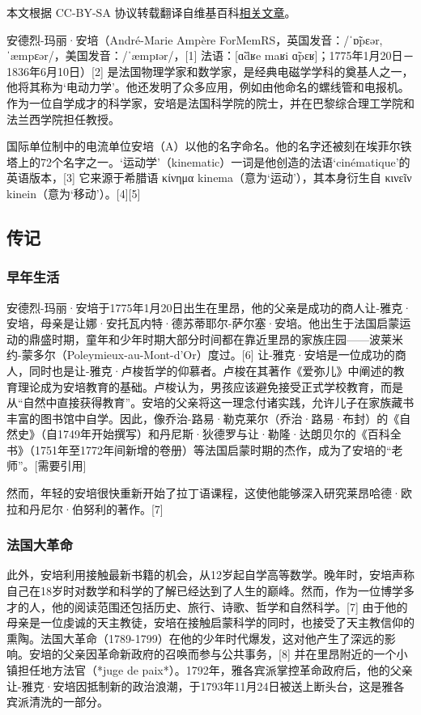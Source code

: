 
本文根据 CC-BY-SA 协议转载翻译自维基百科\href{https://en.wikipedia.org/wiki/Andr\%C3\%A9-Marie_Amp\%C3\%A8re}{相关文章}。

安德烈-玛丽·安培（André-Marie Ampère ForMemRS，英国发音：/ˈɒ̃pɛər, ˈæmpɛər/，美国发音：/ˈæmpɪər/，[1] 法语：[ɑ̃dʁe maʁi ɑ̃pɛʁ]；1775年1月20日－1836年6月10日）[2] 是法国物理学家和数学家，是经典电磁学学科的奠基人之一，他将其称为‘电动力学’。他还发明了众多应用，例如由他命名的螺线管和电报机。作为一位自学成才的科学家，安培是法国科学院的院士，并在巴黎综合理工学院和法兰西学院担任教授。

国际单位制中的电流单位安培（A）以他的名字命名。他的名字还被刻在埃菲尔铁塔上的72个名字之一。‘运动学’（kinematic）一词是他创造的法语‘cinématique’的英语版本，[3] 它来源于希腊语 κίνημα kinema（意为‘运动’），其本身衍生自 κινεῖν kinein（意为‘移动’）。[4][5]
\subsection{传记}
\subsubsection{早年生活} 
安德烈-玛丽·安培于1775年1月20日出生在里昂，他的父亲是成功的商人让-雅克·安培，母亲是让娜·安托瓦内特·德苏蒂耶尔-萨尔塞·安培。他出生于法国启蒙运动的鼎盛时期，童年和少年时期大部分时间都在靠近里昂的家族庄园——波莱米约-蒙多尔（Poleymieux-au-Mont-d'Or）度过。[6] 让-雅克·安培是一位成功的商人，同时也是让-雅克·卢梭哲学的仰慕者。卢梭在其著作《爱弥儿》中阐述的教育理论成为安培教育的基础。卢梭认为，男孩应该避免接受正式学校教育，而是从“自然中直接获得教育”。安培的父亲将这一理念付诸实践，允许儿子在家族藏书丰富的图书馆中自学。因此，像乔治-路易·勒克莱尔（乔治·路易·布封）的《自然史》（自1749年开始撰写）和丹尼斯·狄德罗与让·勒隆·达朗贝尔的《百科全书》（1751年至1772年间新增的卷册）等法国启蒙时期的杰作，成为了安培的“老师”。[需要引用]  

然而，年轻的安培很快重新开始了拉丁语课程，这使他能够深入研究莱昂哈德·欧拉和丹尼尔·伯努利的著作。[7]
\subsubsection{法国大革命}
此外，安培利用接触最新书籍的机会，从12岁起自学高等数学。晚年时，安培声称自己在18岁时对数学和科学的了解已经达到了人生的巅峰。然而，作为一位博学多才的人，他的阅读范围还包括历史、旅行、诗歌、哲学和自然科学。[7] 由于他的母亲是一位虔诚的天主教徒，安培在接触启蒙科学的同时，也接受了天主教信仰的熏陶。法国大革命（1789-1799）在他的少年时代爆发，这对他产生了深远的影响。安培的父亲因革命新政府的召唤而参与公共事务，[8] 并在里昂附近的一个小镇担任地方法官（*juge de paix*）。1792年，雅各宾派掌控革命政府后，他的父亲让-雅克·安培因抵制新的政治浪潮，于1793年11月24日被送上断头台，这是雅各宾派清洗的一部分。

